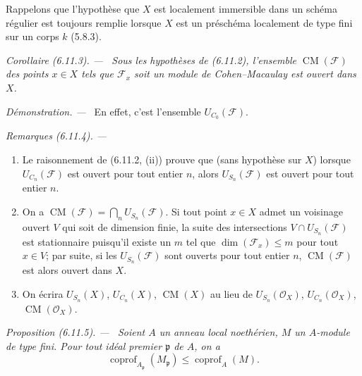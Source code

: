 \documentclass[10pt,oneside]{book}
\newenvironment{proposition}[1][]{%
  \par\medskip\noindent\itshape Proposition (#1). ---\ }{\par}
\newenvironment{corollary}[1][]{%
  \par\medskip\noindent\itshape Corollaire (#1). ---\ }{\par}
\newenvironment{remarks}[1][]{%
  \par\medskip\noindent\itshape Remarques (#1). ---\ }{\par}
\newenvironment{proof}{%
  \par\medskip\noindent\textit{Démonstration. ---\ }}{\par}
\begin{document}
Rappelons que l'hypothèse que $X$ est localement immersible dans un schéma
régulier est toujours remplie lorsque $X$ est un préschéma localement de
type fini sur un corps $k$ (5.8.3).

\begin{corollary}[6.11.3]
\label{IV.2.s6.11.3-fr}
Sous les hypothèses de (6.11.2), l'ensemble $\operatorname{CM}(\mathcal F)$
des points $x\in X$ tels que $\mathcal F_x$ soit un module de
Cohen--Macaulay est ouvert dans $X$.
\end{corollary}

\begin{proof}
En effet, c'est l'ensemble $U_{C_0}(\mathcal F)$.
\end{proof}

\begin{remarks}[6.11.4]
\label{IV.2.s6.11.4-fr}
\begin{enumerate}
\item[(i)] Le raisonnement de (6.11.2, (ii)) prouve que (sans hypothèse sur
$X$) lorsque $U_{C_n}(\mathcal F)$ est ouvert pour tout entier $n$, alors
$U_{S_n}(\mathcal F)$ est ouvert pour tout entier $n$.
\item[(ii)] On a
$\operatorname{CM}(\mathcal F)=\bigcap_nU_{S_n}(\mathcal F)$. Si tout point
$x\in X$ admet un voisinage ouvert $V$ qui soit de dimension finie, la
suite des intersections $V\cap U_{S_n}(\mathcal F)$ est stationnaire
puisqu'il existe un $m$ tel que $\dim(\mathcal F_x)\leq m$ pour tout
$x\in V$; par suite, si les $U_{S_n}(\mathcal F)$ sont ouverts pour tout
entier $n$, $\operatorname{CM}(\mathcal F)$ est alors ouvert dans $X$.
\item[(iii)] On écrira $U_{S_n}(X)$, $U_{C_n}(X)$,
$\operatorname{CM}(X)$ au lieu de $U_{S_n}(\mathcal O_X)$,
$U_{C_n}(\mathcal O_X)$, $\operatorname{CM}(\mathcal O_X)$.
\end{enumerate}
\end{remarks}

\begin{proposition}[6.11.5]
\label{IV.2.s6.11.5-fr}
Soient $A$ un anneau local noethérien, $M$ un $A$-module de type fini. Pour
tout idéal premier $\mathfrak p$ de $A$, on a
\begin{equation}
\operatorname{coprof}_{A_{\mathfrak p}}(M_{\mathfrak p})\leq
\operatorname{coprof}_A(M).
\tag{6.11.5.1}\label{IV.2.s6.11.5.1-fr}
\end{equation}
\end{proposition}
\end{document}

